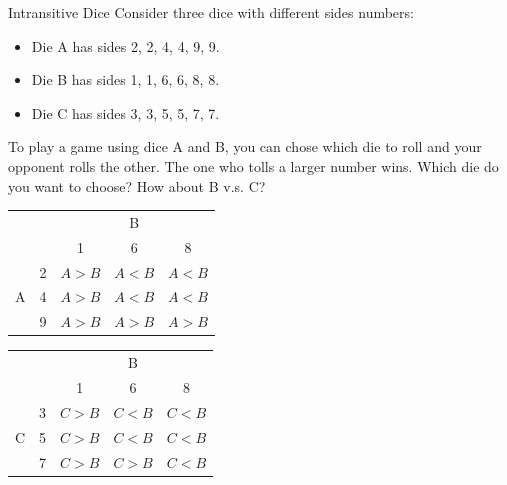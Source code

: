 \documentclass[serif,envcountsect,table,t%
]{beamer}%
\begin{document}
\begin{frame}{Intransitive Dice}
Consider three dice with different sides numbers:
\begin{itemize}
\item Die A has sides 2, 2, 4, 4, 9, 9.
\item Die B has sides 1, 1, 6, 6, 8, 8.
\item Die C has sides 3, 3, 5, 5, 7, 7.
\end{itemize}
To play a game using dice A and B, you can chose which die to roll and your
opponent rolls the other. The one who tolls a larger number wins. Which die do
you want to choose? How about B v.s. C? \pause
\begin{center}\small
  \begin{tabular}{cc|ccc}\hline
    &   & \multicolumn{3}{c}{B} \\
    &   & 1                & 6                & 8                \\ \hline
    \multirow{3}{*}{A}
    & 2 & \color{red}$A>B$ & $A<B$            & $A<B$            \\
    & 4 & \color{red}$A>B$ & $A<B$            & $A<B$            \\
    & 9 & \color{red}$A>B$ & \color{red}$A>B$ & \color{red}$A>B$ \\\hline
  \end{tabular}
  \hspace{.2cm}
  \begin{tabular}{cc|ccc}\hline
    &   & \multicolumn{3}{c}{B} \\
    &   & 1                & 6                & 8                \\ \hline
    \multirow{3}{*}{C}
    & 3 & \color{red}$C>B$ & $C<B$            & $C<B$            \\
    & 5 & \color{red}$C>B$ & $C<B$            & $C<B$            \\
    & 7 & \color{red}$C>B$ & \color{red}$C>B$ & $C<B$ \\\hline
  \end{tabular}
\end{center}
\end{frame}
\end{document}
